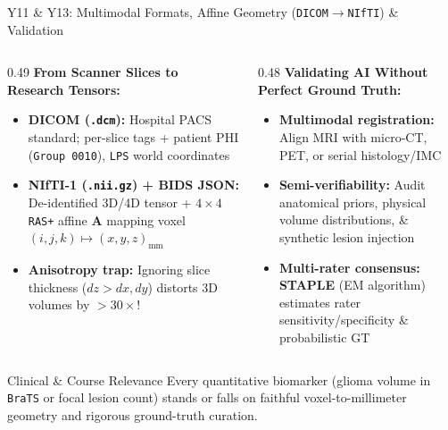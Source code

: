 \documentclass[aspectratio=169, 10pt]{beamer}
\begin{document}
\begin{frame}{Y11 \& Y13: Multimodal Formats, Affine Geometry (\texttt{DICOM$\to$NIfTI}) \& Validation}
    \begin{columns}[T]
        \begin{column}{0.49\textwidth}
            \textbf{From Scanner Slices to Research Tensors:}
            \begin{itemize}\footnotesize
                \item \textbf{DICOM (\texttt{.dcm}):} Hospital PACS standard; per-slice tags + patient PHI (\texttt{Group 0010}), \texttt{LPS} world coordinates
                \item \textbf{NIfTI-1 (\texttt{.nii.gz}) + BIDS JSON:} De-identified 3D/4D tensor + $4\times 4$ \texttt{RAS+} affine $\mathbf{A}$ mapping voxel $(i,j,k)\mapsto (x,y,z)_{\text{mm}}$
                \item \textbf{Anisotropy trap:} Ignoring slice thickness ($dz > dx,dy$) distorts 3D volumes by $>30\times$!
            \end{itemize}
        \end{column}
        \begin{column}{0.48\textwidth}
            \textbf{Validating AI Without Perfect Ground Truth:}
            \begin{itemize}\footnotesize
                \item \textbf{Multimodal registration:} Align MRI with micro-CT, PET, or serial histology/IMC
                \item \textbf{Semi-verifiability:} Audit anatomical priors, physical volume distributions, \& synthetic lesion injection
                \item \textbf{Multi-rater consensus:} \textbf{STAPLE} (EM algorithm) estimates rater sensitivity/specificity \& probabilistic GT
            \end{itemize}
        \end{column}
    \end{columns}

    \vspace{0.15cm}
    \begin{block}{\footnotesize Clinical \& Course Relevance}
        \footnotesize Every quantitative biomarker (glioma volume in \texttt{BraTS} or focal lesion count) stands or falls on faithful voxel-to-millimeter geometry and rigorous ground-truth curation.
    \end{block}
\end{frame}
\end{document}
